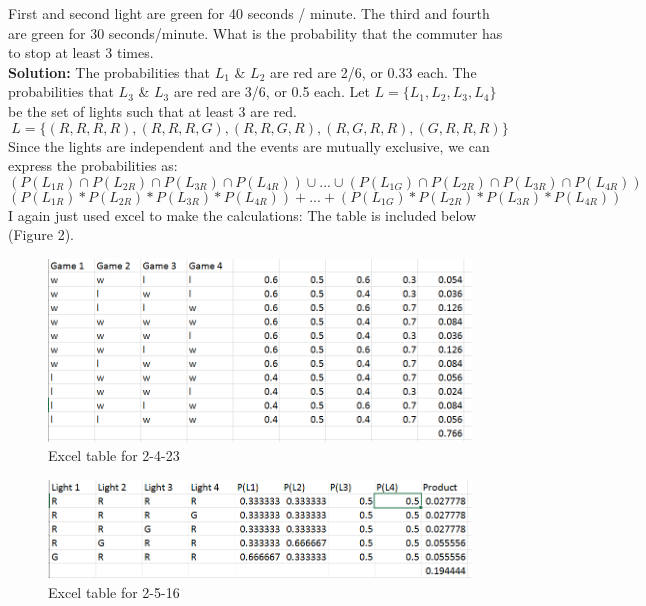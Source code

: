 \documentclass[12pt]{article}
\newenvironment{problem}[2][Problem]{\begin{trivlist}
\item[\hskip \labelsep {\bfseries #1}\hskip \labelsep {\bfseries #2.}]}{\end{trivlist}}
\begin{document}
\begin{problem}{2.5.16} First and second light are green for 40 seconds / minute. The third and fourth are green for 30 seconds/minute. What is the probability that the commuter has to stop at least 3 times. \\
\textbf{Solution:} The probabilities that $L_1$ \& $L_2$ are red are 2/6, or 0.33 each.  The probabilities that $L_3$ \& $L_3$ are red are 3/6, or 0.5 each. Let $L = \{L_1,L_2,L_3,L_4\}$ be the set of lights such that at least 3 are red. 
$$ L = \{(R,R,R,R),(R,R,R,G),(R,R,G,R),(R,G,R,R),(G,R,R,R)\} $$ 
Since the lights are independent and the events are mutually exclusive, we can express the probabilities as: 
$$ (P(L_{1R}) \cap P(L_{2R}) \cap P(L_{3R}) \cap P(L_{4R})) \cup ... \cup (P(L_{1G}) \cap P(L_{2R}) \cap P(L_{3R}) \cap P(L_{4R}))$$
$$ (P(L_{1R}) * P(L_{2R}) * P(L_{3R}) * P(L_{4R})) + ... + (P(L_{1G}) * P(L_{2R}) * P(L_{3R}) * P(L_{4R}))$$
I again just used excel to make the calculations: The table is included below (Figure 2). 

\begin{figure}[h!]
  \includegraphics[width=\linewidth]{2-4-23.png}
  \caption{Excel table for 2-4-23}
  \label{fig:boat1}
\end{figure}

\begin{figure}[h!]
  \includegraphics[width=\linewidth]{2-5-16.png}
  \caption{Excel table for 2-5-16}
  \label{fig:boat1}
\end{figure}

\end{problem}
\end{document}
